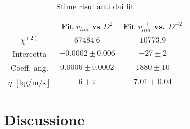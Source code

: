 \documentclass[a4paper,11pt,oneside]{article}
\begin{document}
\begin{table}[h!] %
\centering
    \begin{tabular}{|c|c|c|} \hline
        & Fit $v_{lim}$ vs $D^{2}$ & Fit $v_{lim}^{-1}$ vs. $D^{-2}$ \\ \hline
        \rowcolor[rgb]{0.85,0.85,0.85}${\chi}^{(2)}$ & $67484.6$ & $10773.9$ \\ \hline
        Intercetta & $-0.0002 \pm 0.006$ & $-27 \pm 2$ \\ \hline
        \rowcolor[rgb]{0.85,0.85,0.85}Coeff. ang. & $0.0006 \pm 0.0002$ & $1880 \pm 10$ \\ \hline
        $\eta$ $[\si{\kilo\gram\per\metre\per\second}]$ & $6 \pm 2$ & $7.01 \pm 0.04$ \\ \hline
    \end{tabular}
\caption{Stime risultanti dai fit}
\label{tab:fit}
\end{table}


\section{Discussione}
\end{document}
